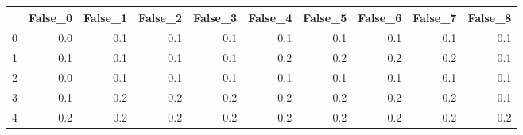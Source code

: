 \begin{tabular}{lrrrrrrrrr}
\toprule
{} &  False\_0 &  False\_1 &  False\_2 &  False\_3 &  False\_4 &  False\_5 &  False\_6 &  False\_7 &  False\_8 \\ \hline
\midrule
0 &      0.0 &      0.1 &      0.1 &      0.1 &      0.1 &      0.1 &      0.1 &      0.1 &      0.1 \\ \hline
1 &      0.1 &      0.1 &      0.1 &      0.1 &      0.2 &      0.2 &      0.2 &      0.2 &      0.1 \\ \hline
2 &      0.0 &      0.1 &      0.1 &      0.1 &      0.1 &      0.1 &      0.1 &      0.1 &      0.1 \\ \hline
3 &      0.1 &      0.2 &      0.2 &      0.2 &      0.2 &      0.2 &      0.2 &      0.2 &      0.1 \\ \hline
4 &      0.2 &      0.2 &      0.2 &      0.2 &      0.2 &      0.2 &      0.2 &      0.2 &      0.2 \\ \hline
\bottomrule
\end{tabular}
